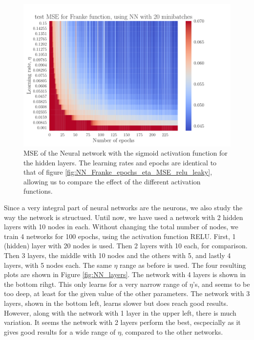 \documentclass[12pt]{extarticle}
\begin{document}
\begin{figure}[h!]
	\includegraphics[width=0.7\linewidth]{NN_Franke/NN_Franke__epochs_eta__test_MSE__compare__600255.pdf}
	\caption{MSE of the Neural network with the sigmoid activation function for the hidden layers. The learning rates and epochs are identical to that of figure \ref{fig:NN_Franke_epochs_eta_MSE_relu_leaky}, allowing us to compare the effect of the different activation functions.}
	\label{fig:NN_Franke_epochs_eta_MSE_sigmoid_compare}
\end{figure}

Since a very integral part of neural networks are the neurons, we also study the way the network is structued. Until now, we have used a network with 2 hidden layers with 10 nodes in each. Without changing the total number of nodes, we train 4 networks for 100 epochs, using the activation function RELU. First, 1 (hidden) layer with 20 nodes is used. Then 2 layers with 10 each, for comparison. Then 3 layers, the middle with 10 nodes and the others with 5, and lastly 4 layers, with 5 nodes each. The same $\eta$ range as before is used. The four resulting plots are shown in Figure \ref{fig:NN_layers}. The network with 4 layers is shown in the bottom rihgt. This only learns for a very narrow range of $\eta$'s, and seems to be too deep, at least for the given value of the other parameters. The network with 3 layers, shown in the bottom left, learns slower but does reach good results. However, along with the network with 1 layer in the upper left, there is much variation. It seems the network with 2 layers perform the best, escpecially as it gives good results for a wide range of $\eta$, compared to the other networks.
\end{document}
